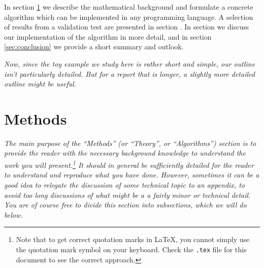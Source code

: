 \documentclass[english,notitlepage,reprint,nofootinbib]{revtex4-1}  %
\begin{document}
	In section \ref{sec:methods} we describe the mathematical background and formulate a concrete algorithm which can be implemented in any programming language. A selection of results from a validation test are presented in section \label{sec:results}. In section \label{sec:discussion} we discuss our implementation of the algorithm in more detail, and in section \ref{sec:conclusion} we provide a short summary and outlook.
	
	\textit{Now, since the toy example we study here is rather short and simple, our outline isn't particularly detailed. But for a report that is longer, a slightly more detailed outline might be useful.}
	
	
	\section{Methods}\label{sec:methods}
	\textit{The main purpose of the ``Methods'' (or ``Theory'', or ``Algorithms'') section is to provide the reader with the necessary background knowledge to understand the work you will present.\footnote{Note that to get correct quotation marks in LaTeX, you cannot simply use the quotation mark symbol on your keyboard. Check the \texttt{.tex} file for this document to see the correct approach.} It should in general be sufficiently detailed for the reader to understand and reproduce what you have done. However, sometimes it can be a good idea to relegate the discussion of some technical topic to an appendix, to avoid too long discussions of what might be a a fairly minor or technical detail. You are of course free to divide this section into subsections, which we will do below.}
	
\end{document}

